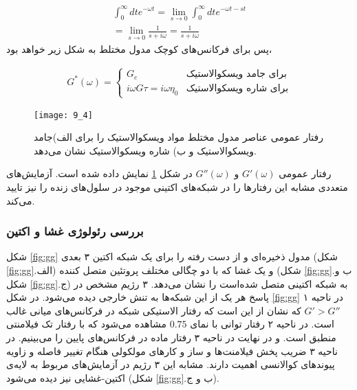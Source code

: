 \begin{equation}
\begin{aligned}
\int_0^\infty dte^{-\omega t}=\lim_{s\rightarrow0}\int_0^\infty dte^{-\omega t-st}\\
=\lim_{s\rightarrow0}\frac{1}{s+i\omega}=\frac{1}{s+i\omega}
\label{eq:saG}
\end{aligned}
\end{equation}
پس برای فرکانس‌های کوچک مدول مختلط به شکل زیر خواهد بود،

\begin{equation}
\begin{aligned}
G^*(\omega)=
  \begin{cases}
    G_e       & \text{برای جامد ویسکوالاستیک}\\
    i\omega G\tau=i\omega\eta_0       & \text{برای شاره ویسکوالاستیک}
  \end{cases}
\end{aligned}
\end{equation}

\begin{figure}[htbp]
\begin{center}
\texttt{[image: 9\_4]}
\caption{
رفتار عمومی عناصر مدول مختلط مواد ویسکوالاستیک را برای الف)جامد ویسکوالاستیک و ب) شاره ویسکوالاستیک نشان می‌دهد.
}
\label{fig:viscoSF}
\end{center}
\end{figure}
رفتار عمومی $G'(\omega)$ و $G''(\omega)$ در شکل \ref{fig:viscoSF} نمایش داده شده است. آزمایش‌‌های متعددی مشابه این رفتار‌ها را در شبکه‌های اکتینی موجود در سلول‌های زنده را نیز تایید می‌کند.





\subsubsection{بررسی رئولوژی غشا و اکتین}\label{lab:GG}

شکل \ref{fig:gg} مدول ذخیره‌ای و از دست رفته را برای یک شبکه اکتین ۳ بعدی (شکل \ref{fig:gg}.الف) و یک غشا که با دو چگالی مختلف پروتئین متصل کننده (شکل \ref{fig:gg}.ب و شکل \ref{fig:gg}.ج) به شبکه اکتینی متصل شده‌است را  نشان می‌دهد\cite{doi:10.1021/acs.jpcb.7b11491}. ۳ رژیم مشخص در پاسخ هر یک از این  شبکه‌ها به تنش خارجی دیده می‌شود. در شکل \ref{fig:gg} در ناحیه ۱  $G'>G''$ که نشان از این است که رفتار الاستیکی شبکه در فرکانس‌های میانی غالب است. در ناحیه ۲ رفتار توانی با نمای $0.75$ مشاهده می‌شود که با رفتار تک فیلامنتی منطبق است. و در نهایت در ناحیه ۳ رفتار ماده در فرکانس‌های پایین را می‌بینیم. در ناحیه ۳ ضریب پخش فیلامنت‌ها و ساز و کارهای مولکولی هنگام تغییر فاصله و زاویه پیوند‌های کوالانسی اهمیت دارند. مشابه این ۳ رژیم در آزمایش‌های مربوط به لایه‌ی اکتین-غشایی نیز دیده می‌شود (شکل \ref{fig:gg}.ب و ج). 

